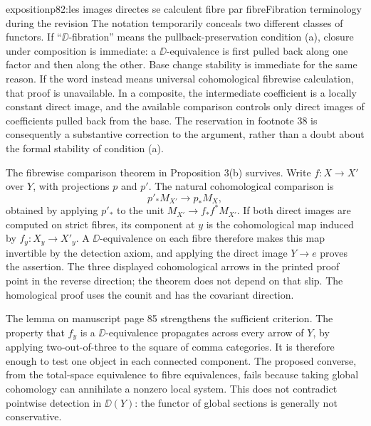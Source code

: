\begin{dcomment}{exposition}{p82:les images directes se calculent fibre par fibre}{Fibration terminology during the revision}
The notation temporarily conceals two different classes of functors. If ``$\DD$-fibration'' means the pullback-preservation condition (a), closure under composition is immediate: a $\DD$-equivalence is first pulled back along one factor and then along the other. Base change stability is immediate for the same reason. If the word instead means universal cohomological fibrewise calculation, that proof is unavailable. In a composite, the intermediate coefficient is a locally constant direct image, and the available comparison controls only direct images of coefficients pulled back from the base. The reservation in footnote 38 is consequently a substantive correction to the argument, rather than a doubt about the formal stability of condition (a).

The fibrewise comparison theorem in Proposition 3(b) survives. Write $f:X\to X'$ over $Y$, with projections $p$ and $p'$. The natural cohomological comparison is
\[
 p'_*M_{X'}\longrightarrow p_*M_X,
\]
obtained by applying $p'_*$ to the unit $M_{X'}\to f_*f^*M_{X'}$. If both direct images are computed on strict fibres, its component at $y$ is the cohomological map induced by $f_y:X_y\to X'_y$. A $\DD$-equivalence on each fibre therefore makes this map invertible by the detection axiom, and applying the direct image $Y\to e$ proves the assertion. The three displayed cohomological arrows in the printed proof point in the reverse direction; the theorem does not depend on that slip. The homological proof uses the counit and has the covariant direction.

The lemma on manuscript page 85 strengthens the sufficient criterion. The property that $f_y$ is a $\DD$-equivalence propagates across every arrow of $Y$, by applying two-out-of-three to the square of comma categories. It is therefore enough to test one object in each connected component. The proposed converse, from the total-space equivalence to fibre equivalences, fails because taking global cohomology can annihilate a nonzero local system. This does not contradict pointwise detection in $\DD(Y)$: the functor of global sections is generally not conservative.
\end{dcomment}


